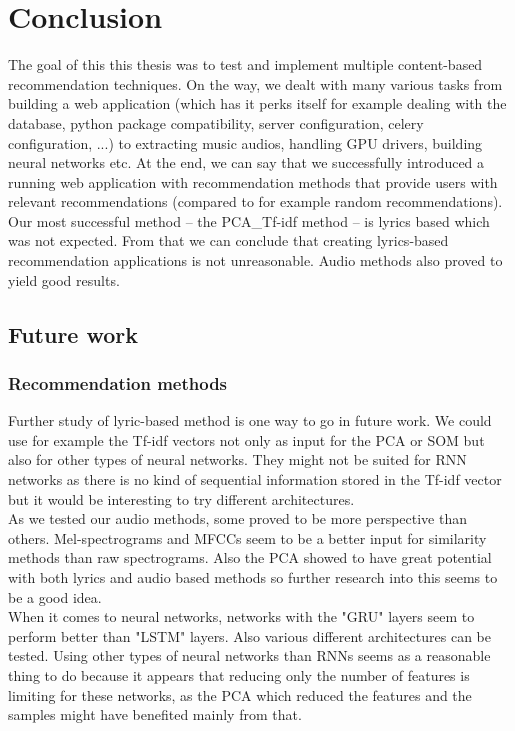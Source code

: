 \chapter*{Conclusion}
The goal of this this thesis was to test and implement multiple content-based recommendation techniques. On the way, we dealt with many various tasks from building a web application (which has it perks itself for example dealing with the database, python package compatibility, server configuration, celery configuration, ...) to extracting music audios, handling GPU drivers, building neural networks etc. At the end, we can say that we successfully introduced a running web application with recommendation methods that provide users with relevant recommendations (compared to for example random recommendations). \\
Our most successful method -- the PCA\_Tf-idf method -- is lyrics based which was not expected. From that we can conclude that creating lyrics-based recommendation applications is not unreasonable. Audio methods also proved to yield good results.

\section*{Future work}
\subsection*{Recommendation methods}
Further study of lyric-based method is one way to go in future work. We could use for example the Tf-idf vectors not only as input for the PCA or SOM but also for other types of neural networks. They might not be suited for RNN networks as there is no kind of sequential information stored in the Tf-idf vector but it would be interesting to try different architectures. \\
As we tested our audio methods, some proved to be more perspective than others. Mel-spectrograms and MFCCs seem to be a better input for similarity methods than raw spectrograms. Also the PCA showed to have great potential with both lyrics and audio based methods so further research into this seems to be a good idea. \\
When it comes to neural networks, networks with the "GRU" layers seem to perform better than "LSTM" layers. Also various different architectures can be tested. Using other types of neural networks than RNNs seems as a reasonable thing to do because it appears that reducing only the number of features is limiting for these networks, as the PCA which reduced the features and the samples might have benefited mainly from that. \\
